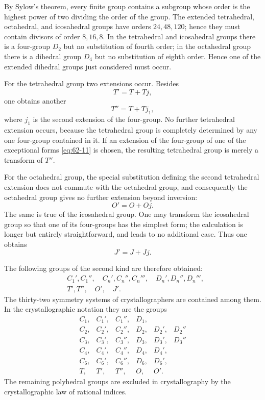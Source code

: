 \documentclass[11pt,a4paper]{article}
\begin{document}
By Sylow's theorem, every finite group contains a subgroup whose order is the highest power of two dividing the order of the group.  The extended tetrahedral, octahedral, and icosahedral groups have orders \(24,48,120\); hence they must contain divisors of order \(8,16,8\).  In the tetrahedral and icosahedral groups there is a four-group \(D_2\) but no substitution of fourth order; in the octahedral group there is a dihedral group \(D_4\) but no substitution of eighth order.  Hence one of the extended dihedral groups just considered must occur.

For the tetrahedral group two extensions occur.  Besides
\[
 T'=T+Tj,
\]
one obtains another
\[
 T''=T+Tj_1,
\]
where \(j_1\) is the second extension of the four-group.  No further tetrahedral extension occurs, because the tetrahedral group is completely determined by any one four-group contained in it.  If an extension of the four-group of one of the exceptional forms \eqref{eq:62-11} is chosen, the resulting tetrahedral group is merely a transform of \(T''\).

For the octahedral group, the special substitution defining the second tetrahedral extension does not commute with the octahedral group, and consequently the octahedral group gives no further extension beyond inversion:
\[
 O'=O+Oj.
\]
The same is true of the icosahedral group.  One may transform the icosahedral group so that one of its four-groups has the simplest form; the calculation is longer but entirely straightforward, and leads to no additional case.  Thus one obtains
\[
 J'=J+Jj.
\]

The following groups of the second kind are therefore obtained:
\begin{align*}
& C_1',C_1'',\quad C_n',C_n'',C_n''',\quad D_n',D_n'',D_n''',\\
& T',T'',\quad O',\quad J'.
\end{align*}
The thirty-two symmetry systems of crystallographers are contained among them.  In the crystallographic notation they are the groups
\[
\begin{array}{llllll}
 C_1, & C_1', & C_1'', & D_1, & & \\
 C_2, & C_2', & C_2'', & D_2, & D_2', & D_2'' \\
 C_3, & C_3', & C_3'', & D_3, & D_3', & D_3'' \\
 C_4, & C_4', & C_4'', & D_4, & D_4', & \\
 C_6, & C_6', & C_6'', & D_6, & D_6', & \\
 T, & T', & T'', & O, & O'. &
\end{array}
\]
The remaining polyhedral groups are excluded in crystallography by the crystallographic law of rational indices.
\end{document}
